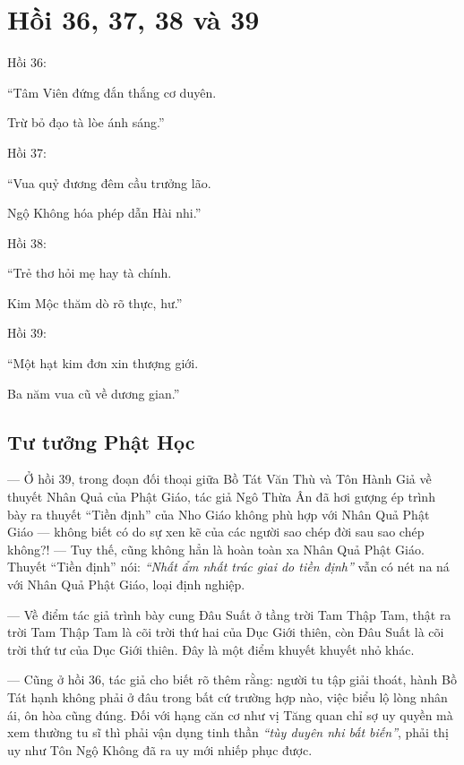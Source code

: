 \chapter{Hồi 36, 37, 38 và 39} %
\label{cha:hoi_36_37}

Hồi 36:

\begin{itshape}
``Tâm Viên đứng đắn thắng cơ duyên.

Trừ bỏ đạo tà lòe ánh sáng.''
\end{itshape}

Hồi 37:

\begin{itshape}
``Vua quỷ đương đêm cầu trưởng lão.

Ngộ Không hóa phép dẫn Hài nhi.''
\end{itshape}

Hồi 38:

\begin{itshape}
``Trẻ thơ hỏi mẹ hay tà chính.

Kim Mộc thăm dò rõ thực, hư.''
\end{itshape}

Hồi 39:

\begin{itshape}
``Một hạt kim đơn xin thượng giới.

Ba năm vua cũ về dương gian.''
\end{itshape}

\section{Tư tưởng Phật Học} %
\label{sec:36_37_phat_hoc}

— Ở hồi 39, trong đoạn đối thoại giữa Bồ Tát Văn Thù và Tôn Hành Giả về thuyết Nhân Quả của Phật Giáo, tác giả Ngô Thừa Ân đã hơi gượng ép trình bày ra thuyết ``Tiền định'' của Nho Giáo không phù hợp với Nhân Quả Phật Giáo — không biết có do sự xen kẽ của các người sao chép đời sau sao chép không?! — Tuy thế, cũng không hẳn là hoàn toàn xa Nhân Quả Phật Giáo. Thuyết ``Tiền định'' nói: \emph{``Nhất ẩm nhất trác giai do tiền định''} vẫn có nét na ná với Nhân Quả Phật Giáo, loại định nghiệp.

— Về điểm tác giả trình bày cung Đâu Suất ở tầng trời Tam Thập Tam, thật ra trời Tam Thập Tam là cõi trời thứ hai của Dục Giới thiên, còn Đâu Suất là cõi trời thứ tư của Dục Giới thiên. Đây là một điểm khuyết khuyết nhỏ khác.

— Cũng ở hồi 36, tác giả cho biết rõ thêm rằng: người tu tập giải thoát, hành Bồ Tát hạnh không phải ở đâu trong bất cứ trường hợp nào, việc biểu lộ lòng nhân ái, ôn hòa cũng đúng. Đối với hạng căn cơ như vị Tăng quan chỉ sợ uy quyền mà xem thường tu sĩ thì phải vận dụng tinh thần \emph{``tùy duyên nhi bất biến''}, phải thị uy như Tôn Ngộ Không đã ra uy mới nhiếp phục được.


